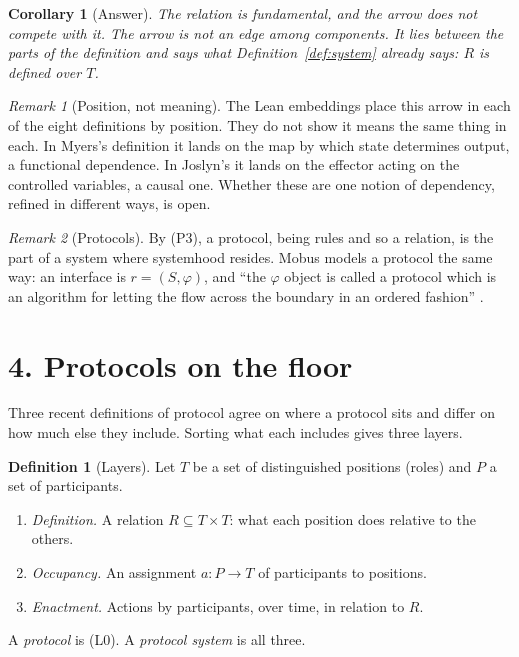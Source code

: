 \documentclass[10pt]{article}
\newtheorem{corollary}[theorem]{Corollary}
\theoremstyle{definition}
\newtheorem{definition}[theorem]{Definition}
\theoremstyle{remark}
\newtheorem*{remark}{Remark}
\begin{document}
\begin{corollary}[Answer]
The relation is fundamental, and the arrow does not compete with it. The arrow is not an edge among components. It lies between the parts of the definition and says what Definition~\ref{def:system} already says: $R$ is defined over $T$.
\end{corollary}

\begin{remark}[Position, not meaning]
The Lean embeddings place this arrow in each of the eight definitions by position. They do not show it means the same thing in each. In Myers's definition it lands on the map by which state determines output, a functional dependence. In Joslyn's it lands on the effector acting on the controlled variables, a causal one. Whether these are one notion of dependency, refined in different ways, is open.
\end{remark}

\begin{remark}[Protocols]
By (P3), a protocol, being rules and so a relation, is the part of a system where systemhood resides. Mobus models a protocol the same way: an interface is $r = (S, \varphi)$, and ``the $\varphi$ object is called a protocol which is an algorithm for letting the flow across the boundary in an ordered fashion'' \cite[ch.~4]{mobus}.
\end{remark}

\section*{4. Protocols on the floor}

Three recent definitions of protocol \cite{walch, rao, tay} agree on where a protocol sits and differ on how much else they include. Sorting what each includes gives three layers.

\begin{definition}[Layers]\label{def:layers}
Let $T$ be a set of distinguished positions (roles) and $P$ a set of participants.
\begin{enumerate}[label=\textbf{(L\arabic*)}, start=0, leftmargin=2.6em, itemsep=0.2em]
  \item \emph{Definition.} A relation $R \subseteq T \times T$: what each position does relative to the others.
  \item \emph{Occupancy.} An assignment $a \colon P \to T$ of participants to positions.
  \item \emph{Enactment.} Actions by participants, over time, in relation to $R$.
\end{enumerate}
A \emph{protocol} is (L0). A \emph{protocol system} is all three.
\end{definition}
\end{document}
